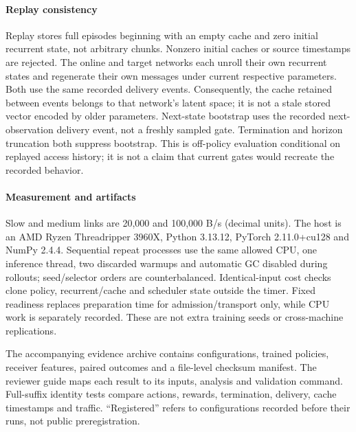 \documentclass[pdflatex,sn-mathphys-num]{sn-jnl}
\begin{document}
\paragraph{Replay consistency} Replay stores full episodes beginning with an empty cache and zero initial recurrent state, not arbitrary chunks. Nonzero initial caches or source timestamps are rejected. The online and target networks each unroll their own recurrent states and regenerate their own messages under current respective parameters. Both use the same recorded delivery events. Consequently, the cache retained between events belongs to that network's latent space; it is not a stale stored vector encoded by older parameters. Next-state bootstrap uses the recorded next-observation delivery event, not a freshly sampled gate. Termination and horizon truncation both suppress bootstrap. This is off-policy evaluation conditional on replayed access history; it is not a claim that current gates would recreate the recorded behavior.

\paragraph{Measurement and artifacts}
Slow and medium links are 20,000 and 100,000 B/s (decimal units). The host is an AMD Ryzen Threadripper 3960X, Python 3.13.12, PyTorch 2.11.0+cu128 and NumPy 2.4.4. Sequential repeat processes use the same allowed CPU, one inference thread, two discarded warmups and automatic GC disabled during rollouts; seed/selector orders are counterbalanced. Identical-input cost checks clone policy, recurrent/cache and scheduler state outside the timer. Fixed readiness replaces preparation time for admission/transport only, while CPU work is separately recorded. These are not extra training seeds or cross-machine replications.

The accompanying evidence archive contains configurations, trained policies, receiver features, paired outcomes and a file-level checksum manifest. The reviewer guide maps each result to its inputs, analysis and validation command. Full-suffix identity tests compare actions, rewards, termination, delivery, cache timestamps and traffic. ``Registered'' refers to configurations recorded before their runs, not public preregistration.
\FloatBarrier
\end{document}
